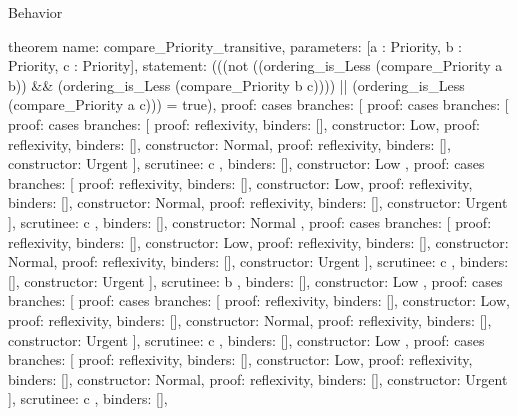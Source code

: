 \begin{lexlean}{Behavior}
\begin{semanticmodule}
theorem{
  name: compare_Priority_transitive,
  parameters: [a : Priority, b : Priority, c : Priority],
  statement: (((not ((ordering_is_Less (compare_Priority a b)) && (ordering_is_Less (compare_Priority b c)))) || (ordering_is_Less (compare_Priority a c))) = true),
  proof: cases{
    branches: [
      {
        proof: cases{
          branches: [
            {
              proof: cases{
                branches: [
                  {proof: reflexivity{}, binders: [], constructor: Low},
                  {proof: reflexivity{}, binders: [], constructor: Normal},
                  {proof: reflexivity{}, binders: [], constructor: Urgent}
                ],
                scrutinee: c
              },
              binders: [],
              constructor: Low
            },
            {
              proof: cases{
                branches: [
                  {proof: reflexivity{}, binders: [], constructor: Low},
                  {proof: reflexivity{}, binders: [], constructor: Normal},
                  {proof: reflexivity{}, binders: [], constructor: Urgent}
                ],
                scrutinee: c
              },
              binders: [],
              constructor: Normal
            },
            {
              proof: cases{
                branches: [
                  {proof: reflexivity{}, binders: [], constructor: Low},
                  {proof: reflexivity{}, binders: [], constructor: Normal},
                  {proof: reflexivity{}, binders: [], constructor: Urgent}
                ],
                scrutinee: c
              },
              binders: [],
              constructor: Urgent
            }
          ],
          scrutinee: b
        },
        binders: [],
        constructor: Low
      },
      {
        proof: cases{
          branches: [
            {
              proof: cases{
                branches: [
                  {proof: reflexivity{}, binders: [], constructor: Low},
                  {proof: reflexivity{}, binders: [], constructor: Normal},
                  {proof: reflexivity{}, binders: [], constructor: Urgent}
                ],
                scrutinee: c
              },
              binders: [],
              constructor: Low
            },
            {
              proof: cases{
                branches: [
                  {proof: reflexivity{}, binders: [], constructor: Low},
                  {proof: reflexivity{}, binders: [], constructor: Normal},
                  {proof: reflexivity{}, binders: [], constructor: Urgent}
                ],
                scrutinee: c
              },
              binders: [],
}}}}}
\end{semanticmodule}
\end{lexlean}
